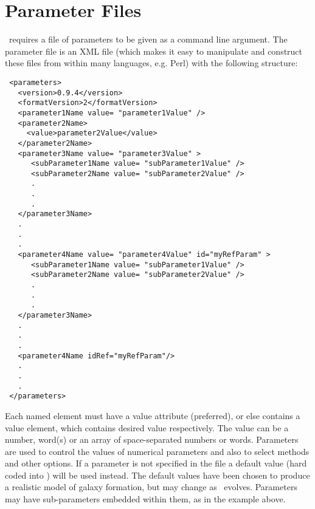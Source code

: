 \section{Parameter Files}\label{sec:ParameterFiles}

\glc\ requires a file of parameters to be given as a command line argument. The parameter file is an XML file (which makes it easy to manipulate and construct these files from within many languages, e.g. Perl) with the following structure:
\begin{verbatim}
 <parameters>
   <version>0.9.4</version>
   <formatVersion>2</formatVersion>
   <parameter1Name value= "parameter1Value" />
   <parameter2Name>
     <value>parameter2Value</value>
   </parameter2Name>
   <parameter3Name value= "parameter3Value" >
      <subParameter1Name value= "subParameter1Value" />
      <subParameter2Name value= "subParameter2Value" />
      .
      .
      .
   </parameter3Name>
   .
   .
   .
   <parameter4Name value= "parameter4Value" id="myRefParam" >
      <subParameter1Name value= "subParameter1Value" />
      <subParameter2Name value= "subParameter2Value" />
      .
      .
      .
   </parameter3Name>
   .
   .
   .
   <parameter4Name idRef="myRefParam"/>
   .
   .
   .
 </parameters>
\end{verbatim}
Each named element must have a {\normalfont \ttfamily value} attribute (preferred), or else contains a value element, which contains desired value respectively. The value can be a number, word(s) or an array of space-separated numbers or words. Parameters are used to control the values of numerical parameters and also to select methods and other options. If a parameter is not specified in the file a default value (hard coded into \glc) will be used instead. The default values have been chosen to produce a realistic model of galaxy formation, but may change as \glc\ evolves. Parameters may have sub-parameters embedded within them, as in the example above.


